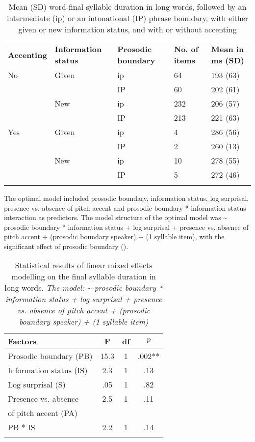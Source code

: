 \documentclass[output=paper,colorlinks,citecolor=brown]{langscibook}
\begin{document}
\begin{table}
\begin{tabularx}{0.8\textwidth}{QQQQQ}
\lsptoprule
{A}ccenting & {I}nformation status & {P}rosodic boundary & {N}o. of items & {M}ean in ms ({SD})\\ \hline
 No & Given & ip & 64 & 193 (63)\\
  &  & IP & 60 & 202 (61)\\
  & New & ip & 232 & 206 (57)\\
  & & IP & 213 & 221 (63)\\
 Yes & Given & ip & 4 & 286 (56)\\
  & & IP & 2 & 260 (13)\\
  & New & ip & 10 & 278 (55)\\
  & & IP & 5 & 272 (46)\\
\lspbottomrule
\end{tabularx}
\caption{Mean (SD) word-final syllable duration in long words, followed by an intermediate (ip) or an intonational (IP) phrase boundary, with either given or new information status, and with or without accenting}
\label{table:6}
\end{table}

The optimal model included prosodic boundary, information status, log surprisal, presence vs. absence of pitch accent and prosodic boundary * information status interaction as predictors. The model structure of the optimal model was {\textasciitilde} prosodic boundary * information status + log surprisal + presence vs. absence of pitch accent + (prosodic boundary {\textbar} speaker) + (1 {\textbar} syllable item), with the significant effect of prosodic boundary ().

\begin{table}[t]
\begin{tabular}{l S[table-format=2.1] c S[table-format=1.3{**}]}
\lsptoprule
 {F}actors & {F} & df & {$p$}\\\midrule
 Prosodic boundary (PB) & 15.3 & 1 & .002{**}\\
 Information status (IS) & 2.3 & 1 & .13\\
 Log surprisal (S) & .05 & 1 & .82\\
 Presence vs. absence  & 2.5 & 1 & .11\\
 \quad of pitch accent (PA) & \\
 PB * IS & 2.2 & 1 & .14\\
\lspbottomrule
\end{tabular}
\caption{Statistical results of linear mixed effects modelling on the final syllable duration in long words. \textit{The model: {\textasciitilde} prosodic boundary * information status + log surprisal + presence vs. absence of pitch accent + (prosodic boundary {\textbar} speaker) + (1 {\textbar} syllable item)}}
\label{table:7}
\end{table}
\end{document}
